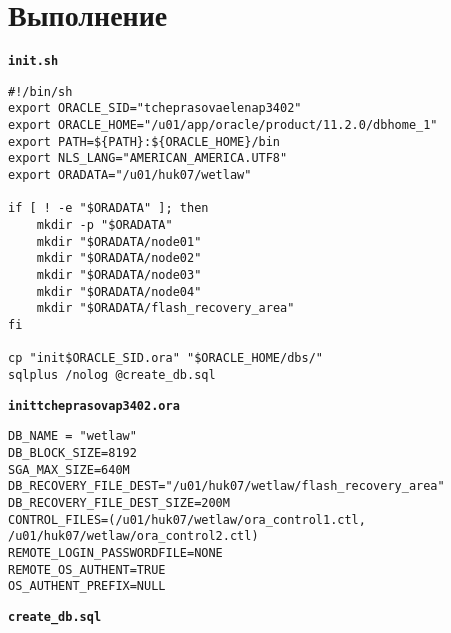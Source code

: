 \documentclass[12pt, a4paper]{article}
\begin{document}
	\section{Выполнение}
	\texttt{\textbf{init.sh}}\\
	\begin{lstlisting}
#!/bin/sh
export ORACLE_SID="tcheprasovaelenap3402"
export ORACLE_HOME="/u01/app/oracle/product/11.2.0/dbhome_1"
export PATH=${PATH}:${ORACLE_HOME}/bin
export NLS_LANG="AMERICAN_AMERICA.UTF8"
export ORADATA="/u01/huk07/wetlaw"

if [ ! -e "$ORADATA" ]; then
	mkdir -p "$ORADATA"
	mkdir "$ORADATA/node01"
	mkdir "$ORADATA/node02"
	mkdir "$ORADATA/node03"
	mkdir "$ORADATA/node04"
	mkdir "$ORADATA/flash_recovery_area"
fi

cp "init$ORACLE_SID.ora" "$ORACLE_HOME/dbs/"
sqlplus /nolog @create_db.sql
	\end{lstlisting}
	\vspace{2.7cm}
	\textbf{\texttt{inittcheprasovap3402.ora}}\\
	\begin{lstlisting}
DB_NAME = "wetlaw"
DB_BLOCK_SIZE=8192
SGA_MAX_SIZE=640M
DB_RECOVERY_FILE_DEST="/u01/huk07/wetlaw/flash_recovery_area"
DB_RECOVERY_FILE_DEST_SIZE=200M
CONTROL_FILES=(/u01/huk07/wetlaw/ora_control1.ctl, /u01/huk07/wetlaw/ora_control2.ctl)
REMOTE_LOGIN_PASSWORDFILE=NONE
REMOTE_OS_AUTHENT=TRUE
OS_AUTHENT_PREFIX=NULL
	\end{lstlisting}
	\vspace{2.7cm}
	\texttt{\textbf{create\_db.sql}}\\
\end{document}
